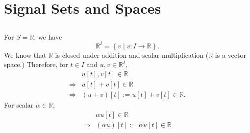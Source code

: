 \section{Signal Sets and Spaces}\label{sec:part4}

\subsection{}\label{subsec:p4-a}
For $S = \mathbb{R}$, we have
\[\mathbb{R}^I = \left\{v \mid v: I \rightarrow \mathbb{R} \right\}.\]
We know that $\mathbb{R}$ is closed under addition and scalar multiplication ($\mathbb{R}$ is a vector space.) Therefore, for $t \in I$ and $u,v \in \mathbb{R}^I$,
\begin{align*}
	&u[t], v[t] \in \mathbb{R} \\
	\Rightarrow &u[t] + v[t] \in \mathbb{R} \\
	\Rightarrow &(u+v)[t] := u[t] + v[t] \in \mathbb{R} .
\end{align*}
For scalar $\alpha \in \mathbb{R}$,
\begin{align*}
	&\alpha u[t] \in \mathbb{R} \\
	\Rightarrow &(\alpha u)[t] := \alpha u[t] \in \mathbb{R}
\end{align*}


